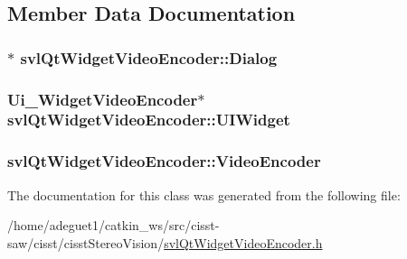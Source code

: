 \subsection{Member Data Documentation}
\hypertarget{classsvl_qt_widget_video_encoder_a0174ccfca03a7e3d6f1bdd1f0d7947be}{
\subsubsection[{Dialog}]{$\ast$ svl\-Qt\-Widget\-Video\-Encoder\-::\-Dialog\hspace{0.3cm}{\ttfamily [protected]}}}\label{classsvl_qt_widget_video_encoder_a0174ccfca03a7e3d6f1bdd1f0d7947be}
\hypertarget{classsvl_qt_widget_video_encoder_a981a193bb20b562f91838e3270eb99cc}{
\subsubsection[{U\-I\-Widget}]{\setlength{\rightskip}{0pt plus 5cm}Ui\-\_\-\-Widget\-Video\-Encoder$\ast$ svl\-Qt\-Widget\-Video\-Encoder\-::\-U\-I\-Widget\hspace{0.3cm}{\ttfamily [protected]}}}\label{classsvl_qt_widget_video_encoder_a981a193bb20b562f91838e3270eb99cc}
\hypertarget{classsvl_qt_widget_video_encoder_a2ed567dc99004fa316aae01879a44994}{
\subsubsection[{Video\-Encoder}]{ svl\-Qt\-Widget\-Video\-Encoder\-::\-Video\-Encoder}}\label{classsvl_qt_widget_video_encoder_a2ed567dc99004fa316aae01879a44994}


The documentation for this class was generated from the following file\-:\begin{DoxyCompactItemize}
\item 
/home/adeguet1/catkin\-\_\-ws/src/cisst-\/saw/cisst/cisst\-Stereo\-Vision/\hyperlink{svl_qt_widget_video_encoder_8h}{svl\-Qt\-Widget\-Video\-Encoder.\-h}\end{DoxyCompactItemize}
